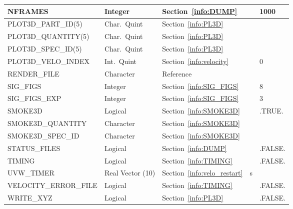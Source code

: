\documentclass[11pt]{book}
\begin{document}
\begin{longtable}{@{\extracolsep{\fill}}|l|l|l|l|l|}
{\ct NFRAMES}                       & Integer      & Section~\ref{info:DUMP}                &           & 1000                           \\ \hline
{\ct PLOT3D\_PART\_ID(5)}           & Char.~Quint  & Section~\ref{info:PL3D}                &           &                                \\ \hline
{\ct PLOT3D\_QUANTITY(5)}           & Char.~Quint  & Section~\ref{info:PL3D}                &           &                                \\ \hline
{\ct PLOT3D\_SPEC\_ID(5)}           & Char.~Quint  & Section~\ref{info:PL3D}                &           &                                \\ \hline
{\ct PLOT3D\_VELO\_INDEX}           & Int.~Quint   & Section~\ref{info:velocity}            &           &  0                             \\ \hline
{\ct RENDER\_FILE}                  & Character    & Reference~\cite{Smokeview_Users_Guide} &           &                                \\ \hline
{\ct SIG\_FIGS}                     & Integer      & Section~\ref{info:SIG_FIGS}            &           & 8                              \\ \hline
{\ct SIG\_FIGS\_EXP}                & Integer      & Section~\ref{info:SIG_FIGS}            &           & 3                              \\ \hline
{\ct SMOKE3D}                       & Logical      & Section~\ref{info:SMOKE3D}             &           & {\ct .TRUE.}                   \\ \hline
{\ct SMOKE3D\_QUANTITY}             & Character    & Section~\ref{info:SMOKE3D}             &           &                                \\ \hline
{\ct SMOKE3D\_SPEC\_ID}             & Character    & Section~\ref{info:SMOKE3D}             &           &                                \\ \hline
{\ct STATUS\_FILES}                 & Logical      & Section~\ref{info:DUMP}                &           & {\ct .FALSE.}                  \\ \hline
{\ct TIMING}                        & Logical      & Section~\ref{info:TIMING}              &           & {\ct .FALSE.}                  \\ \hline
{\ct UVW\_TIMER}                    & Real Vector (10)  & Section~\ref{info:velo_restart}   &  s        &                                \\ \hline
{\ct VELOCITY\_ERROR\_FILE}         & Logical      & Section~\ref{info:TIMING}              &           & {\ct .FALSE.}                  \\ \hline
{\ct WRITE\_XYZ}                    & Logical      & Section~\ref{info:PL3D}                &           & {\ct .FALSE.}                  \\ \hline
\end{longtable}
\end{document}
